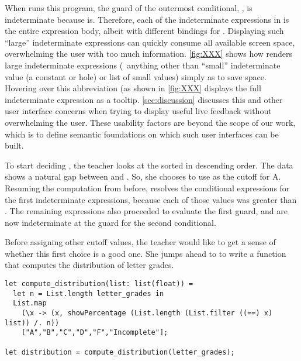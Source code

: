 \noindent
%
When \HazelnutLive{} runs this program, the guard of the outermost conditional,
, is indeterminate because  is.
%
Therefore, each of the indeterminate expressions in  is the
entire expression body, albeit with different bindings for .
%
Displaying such ``large'' indeterminate expressions can quickly consume all
available screen space, overwhelming the user with too much information.
%
\autoref{fig:XXX} shows how \HazelnutLive{} renders large indeterminate
expressions (\ie{}~anything other than ``small'' indeterminate value (a constant
or hole) or list of small values) simply as  to save space.
%
Hovering over this abbreviation (as shown in \autoref{fig:XXX} displays the full
indeterminate expression as a tooltip.
%
\autoref{sec:discussion} discusses this and other user interface concerns when
trying to display useful live feedback without overwhelming the user.
%
These usability factors are beyond the scope of our work, which is to define
semantic foundations on which such user interfaces can be built.

To start deciding , the teacher looks at the 
sorted in descending order.
%
The data shows a natural gap between  and .
%
So, she chooses to use  as the cutoff for A.
%
Resuming the computation from before, \HazelnutLive{} resolves the conditional
expressions for the first  indeterminate expressions, because each of
those  values was greater than .
%
The remaining  expressions also proceeded to evaluate the first guard,
and are now indeterminate at the guard for the second conditional.

Before assigning other cutoff values, the teacher would like to get a sense of
whether this first choice is a good one.
%
She jumps ahead to to write a function that computes the distribution of letter
grades.

\begin{lstlisting}
let compute_distribution(list: list(float)) =
  let n = List.length letter_grades in
  List.map
    (\x -> (x, showPercentage (List.length (List.filter ((==) x) list)) /. n))
    ["A","B","C","D","F","Incomplete"];

let distribution = compute_distribution(letter_grades);
\end{lstlisting}

